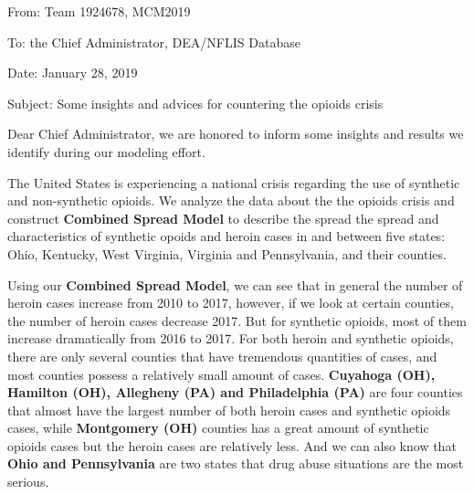 \documentclass{mcmthesis}
\numberwithin{equation}{section}
\numberwithin{figure}{section}
\numberwithin{table}{section}
\theoremstyle{mydef}
\begin{document}
\maketitle
\newpage                 
                                        
\begin{adjustwidth}{-1cm}{0cm}
	\setcounter{tocdepth}{3}
	\pagestyle{empty}
	\tableofcontents  
	\thispagestyle{empty}                                            
\end{adjustwidth}


\newpage

\pagestyle{fancy}

\setcounter{page}{1}


\noindent From: Team 1924678, MCM2019

\noindent To: the Chief Administrator, DEA/NFLIS Database

\noindent Date: January 28, 2019

\noindent Subject: Some insights and advices for countering the opioids crisis

Dear Chief Administrator, we are honored to inform some insights and results we identify during our modeling effort.

The United States is experiencing a national crisis regarding the use of synthetic and non-synthetic opioids. We analyze the data about the the opioids crisis and construct {\bf{Combined Spread Model}} to describe the spread the spread and characteristics of synthetic opoids and heroin cases in and between five states: Ohio, Kentucky, West Virginia, Virginia and Pennsylvania, and their counties.

Using our {\bf{Combined Spread Model}}, we can see that in general the number of heroin cases increase from 2010 to 2017, however, if we look at certain counties, the number of heroin cases decrease  2017. But for synthetic opioids, most of them increase dramatically from 2016 to 2017. For both heroin and synthetic opioids, there are only several counties that have tremendous quantities of cases, and most counties possess a relatively small amount of cases. {\bf{Cuyahoga (OH), Hamilton (OH), Allegheny (PA) and Philadelphia (PA)}} are four counties that almost have the largest number of both heroin cases and synthetic opioids cases, while  {\bf{Montgomery (OH)}} counties has a great amount of synthetic opioids cases but the heroin cases are relatively less. And we can also know that {\bf {Ohio and Pennsylvania}} are two states that drug abuse situations are the most serious.
\end{document}
